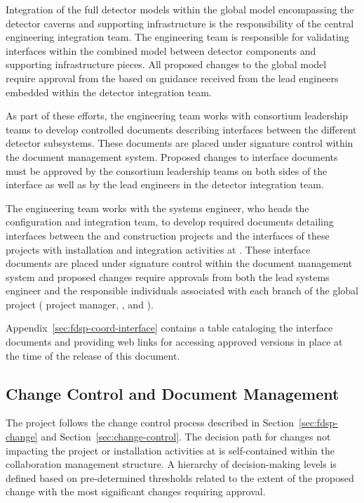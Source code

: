 Integration of the full detector models within the global model
encompassing the detector caverns and supporting infrastructure
is the responsibility of the central  engineering 
integration team.  The  engineering team is responsible 
for validating interfaces within the combined model between 
 detector components and supporting infrastructure 
pieces.  All proposed changes to the global model require approval 
from the  based on guidance received from the lead 
engineers embedded within the  detector integration team.

As part of these efforts, the engineering team works 
with consortium leadership teams to develop controlled 
documents describing interfaces between the different detector 
subsystems.  These documents are placed under signature control 
within the  document management system.  
Proposed changes to interface documents must be approved by 
the consortium leadership teams on both sides of the interface 
as well as by the lead engineers in the  
detector integration team.

The  engineering team works with the
 systems engineer, who heads the  
configuration and integration team, to develop required documents 
detailing interfaces between the  and  
 construction projects and the interfaces of these 
projects with  installation and integration
activities at .  These  interface 
documents are placed under signature control within the 
 document management system and proposed 
changes require approvals from both the lead  
systems engineer and the responsible individuals associated 
with each branch of the global project ( project 
manager,  , and ).

Appendix~\ref{sec:fdsp-coord-interface} contains a table 
cataloging the  interface documents 
and providing web links for accessing approved versions 
 in place at the time of the release of this document.
 
\subsection{Change Control and Document Management}
\label{sec:tc_change control}

The  project follows the  change control
process described in Section~\ref{sec:fdsp-change} and
Section~\ref{sec:change-control}.  The decision path for changes not
impacting the  project or  
installation activities at  is self-contained within
the  collaboration management structure.  A hierarchy of
decision-making levels is defined based on pre-determined thresholds
related to the extent of the proposed change with the most significant
changes requiring   approval.

